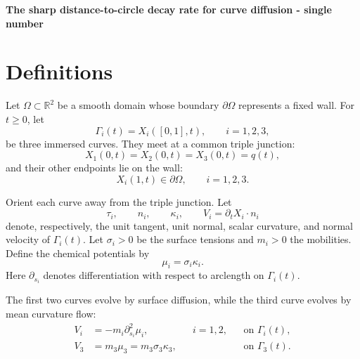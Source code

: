 \documentclass[11pt,a4paper]{article}
\theoremstyle{definition}
\begin{document}
\begin{center}
  {\Large\bfseries The sharp distance-to-circle decay rate for curve
diffusion - single number}
\end{center}

\section{Definitions}

Let $\Omega\subset\mathbb R^2$ be a smooth domain whose boundary
$\partial\Omega$ represents a fixed wall. For $t\geq0$, let
\begin{equation}
  \Gamma_i(t)=X_i([0,1],t),
  \qquad i=1,2,3,
\end{equation}
be three immersed curves. They meet at a common triple junction:
\begin{equation}
  X_1(0,t)=X_2(0,t)=X_3(0,t)=q(t),
\end{equation}
and their other endpoints lie on the wall:
\begin{equation}
  X_i(1,t)\in\partial\Omega,
  \qquad i=1,2,3.
\end{equation}

Orient each curve away from the triple junction. Let
\begin{equation}
  \tau_i,
  \qquad
  n_i,
  \qquad
  \kappa_i,
  \qquad
  V_i=\partial_tX_i\cdot n_i
\end{equation}
denote, respectively, the unit tangent, unit normal, scalar curvature, and
normal velocity of $\Gamma_i(t)$. Let $\sigma_i>0$ be the surface tensions
and $m_i>0$ the mobilities. Define the chemical potentials by
\begin{equation}
  \mu_i=\sigma_i\kappa_i.
\end{equation}
Here $\partial_{s_i}$ denotes differentiation with respect to arclength on
$\Gamma_i(t)$.

The first two curves evolve by surface diffusion, while the third curve
evolves by mean curvature flow:
\begin{equation}
  \begin{aligned}
    V_i
    &= -m_i\partial_{s_i}^2\mu_i,
    && i=1,2,
    && \text{on }\Gamma_i(t),\\
    V_3
    &= m_3\mu_3=m_3\sigma_3\kappa_3,
    &&
    && \text{on }\Gamma_3(t).
  \end{aligned}
  \label{eq:evolution}
\end{equation}
\end{document}

